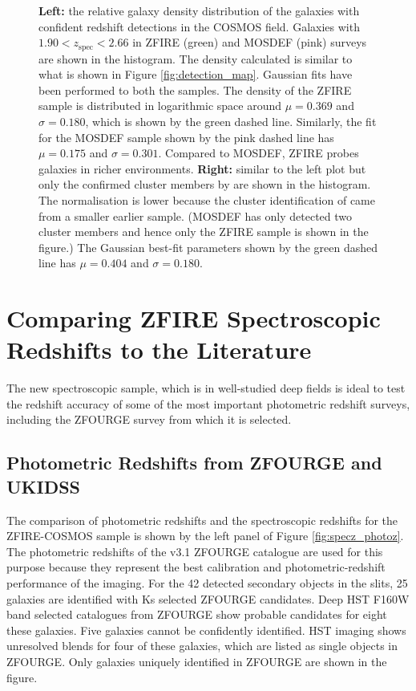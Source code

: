 \documentclass[iop]{emulateapj}
\begin{document}
\begin{figure}
\caption{ {\bf Left:} the relative galaxy density distribution of the galaxies with confident redshift  detections in the COSMOS field. Galaxies with $1.90<z_\mathrm{spec}<2.66$  in ZFIRE (green) and MOSDEF (pink) surveys are shown in the histogram. The density calculated is similar to what is shown in Figure \ref{fig:detection_map}.
Gaussian fits have been performed to both the samples. The density of the ZFIRE sample is distributed in logarithmic space around $\mu=0.369$ and $\sigma=0.180$, which is shown by the green dashed line. Similarly, the fit for the MOSDEF sample shown by the pink dashed line has $\mu=0.175$ and $\sigma=0.301$. Compared to MOSDEF, ZFIRE probes galaxies in richer environments. 
{\bf Right:} similar to the left plot but only the confirmed cluster members by \citet{Yuan2014} are shown in the histogram. The normalisation is lower because  the cluster identification of \citet{Yuan2014} came from a smaller earlier sample. (MOSDEF has only detected two cluster members and hence only the ZFIRE sample is shown in the figure.) The Gaussian best-fit parameters shown by the green dashed line has $\mu=0.404$ and $\sigma=0.180$. 
}
\label{fig:density_hist}
\end{figure}


\section{Comparing ZFIRE Spectroscopic Redshifts to the Literature}
\label{sec:photometric_redshifts}

The new spectroscopic sample, which is in well-studied deep fields is ideal to test the redshift accuracy of some of the most important photometric redshift surveys, including the ZFOURGE survey from which it is selected.

\subsection{Photometric Redshifts from ZFOURGE and UKIDSS}

The comparison of photometric redshifts and the spectroscopic redshifts for the ZFIRE-COSMOS sample is shown by the left panel of Figure \ref{fig:specz_photoz}. The photometric redshifts of the v3.1 ZFOURGE catalogue are used for this purpose because they represent the best calibration and photometric-redshift performance of the imaging. 
For the 42 detected secondary objects in the slits, 25 galaxies are identified with Ks selected ZFOURGE candidates.
Deep HST F160W band selected catalogues from ZFOURGE show probable candidates for eight these galaxies. 
Five galaxies cannot be confidently identified. HST imaging shows unresolved blends for four of these galaxies, which are listed as single objects in ZFOURGE. 
Only galaxies uniquely identified in ZFOURGE are shown in the figure. 
\end{document}
